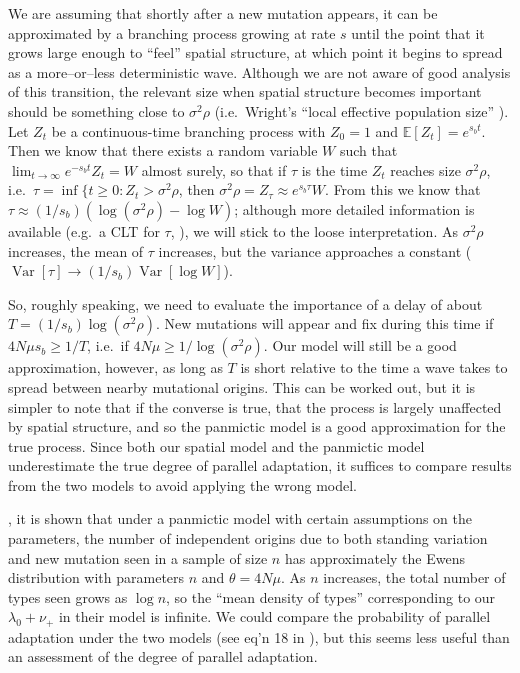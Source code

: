 \documentclass{article}
\newcommand{\var}{\mathop{\mbox{Var}}}
\newcommand{\E}{\mathbb{E}}
\begin{document}
We are assuming that shortly after a new mutation appears, 
it can be approximated by a branching process growing at rate $s$
until the point that it grows large enough to ``feel'' spatial structure,
at which point it begins to spread as a more--or--less deterministic wave.
Although we are not aware of good analysis of this transition, 
the relevant size when spatial structure becomes important
should be something close to $\sigma^2 \rho$ 
(i.e.\ Wright's ``local effective population size'' \citep{XXX}).
Let $Z_t$ be a continuous-time branching process with $Z_0=1$ and $\E[Z_t] = e^{s_b t}$.
Then we know that there exists a random variable $W$ such that $\lim_{t\to\infty} e^{-s_b t} Z_t = W$ almost surely,
so that if $\tau$ is the time $Z_t$ reaches size $\sigma^2 \rho$, i.e.\ $\tau = \inf\{ t \ge 0: Z_t > \sigma^2 \rho$,
then $\sigma^2 \rho = Z_\tau \approx e^{s_b \tau} W$.
From this we know that $\tau \approx (1/s_b) (\log (\sigma^2 \rho) - \log W)$;
although more detailed information is available (e.g.\ a CLT for $\tau$, \citet{XXX}),
we will stick to the loose interpretation.
As $\sigma^2 \rho$ increases, the mean of $\tau$ increases, but the variance approaches a constant
($\var[\tau] \to (1/s_b) \var[\log W]$).

So, roughly speaking, we need to evaluate the importance of a delay of about $T = (1/s_b) \log (\sigma^2 \rho)$.
New mutations will appear and fix during this time if $4N\mu s_b \ge 1/T$,
i.e.\ if $4 N \mu \ge 1/\log (\sigma^2 \rho)$.
Our model will still be a good approximation, however, 
as long as $T$ is short relative to the time a wave takes to spread between nearby mutational origins.
This can be worked out,
but it is simpler to note that if the converse is true, 
that the process is largely unaffected by spatial structure,
and so the panmictic model is a good approximation for the true process.
Since both our spatial model and the panmictic model underestimate the true degree of parallel adaptation,
it suffices to compare results from the two models to avoid applying the wrong model.


\citet{softsweepsII}, it is shown that under a panmictic model with certain assumptions on the parameters,
the number of independent origins due to both standing variation and new mutation seen in a sample of size $n$
has approximately the Ewens distribution with parameters $n$ and $\theta = 4 N \mu$.
As $n$ increases, the total number of types seen grows as $\log n$, 
so the ``mean density of types'' corresponding to our $\lambda_0 + \nu_+$ in their model is infinite.
We could compare the probability of parallel adaptation under the two models (see eq'n 18 in \citet{softsweepsII}),
but this seems less useful than an assessment of the degree of parallel adaptation.
\end{document}
